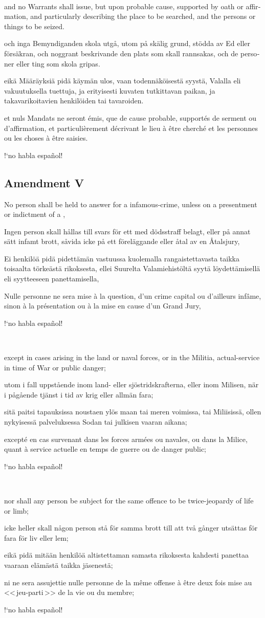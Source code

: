 \documentclass[a4paper,landscape,10pt]{article}
\newcommand{\tblock}[5]{\noindent\begin{minipage}[t]{0.18\textwidth}\foreignlanguage{english}{#1}\end{minipage}\hskip 0.025\textwidth\begin{minipage}[t]{0.18\textwidth}\foreignlanguage{swedish}{#2}\end{minipage}\hskip 0.025\textwidth\begin{minipage}[t]{0.18\textwidth}\foreignlanguage{finnish}{#3}\end{minipage}\hskip 0.025\textwidth\begin{minipage}[t]{0.18\textwidth}\foreignlanguage{french}{#4}\end{minipage}\hskip 0.025\textwidth\begin{minipage}[t]{0.18\textwidth}\foreignlanguage{spanish}{#5}\end{minipage}}
\begin{document}
~

\tblock
{and no Warrants shall issue, but upon probable cause, supported by \Gls{oath} or \gls{affirmation}, and particularly describing the place to be searched, and the persons or things to be seized.}
{och inga Bemyndiganden skola utgå, utom på skälig grund, stödda av Ed eller försäkran, och noggrant beskrivande den plats som skall rannsakas, och de personer eller ting som skola gripas.}
{eikä Määräyksiä pidä käymän ulos, vaan todennäköisestä syystä, Valalla eli vakuutuksella tuettuja, ja erityisesti kuvaten tutkittavan paikan, ja takavarikoitavien henkilöiden tai tavaroiden.}
{et nuls Mandats ne seront émis, que de cause probable, supportés de serment ou d'affirmation, et particulièrement décrivant le lieu à être cherché et les personnes ou les choses à être saisies.}
{!`no habla español!}

\subsection*{Amendment V}
\tblock
{No person shall be held to answer for a \gls{infamous-crime}, unless on a \gls{presentment} or \gls{indictment} of a \glslink{grand-jury}{Grand Jury},}
{Ingen person skall hållas till svars för ett med dödsstraff belagt, eller på annat sätt infamt brott, såvida icke på ett föreläggande eller åtal av en Åtalsjury,}
{Ei henkilöä pidä pidettämän vastuussa kuolemalla rangaistettavasta taikka toisaalta törkeästä rikoksesta, ellei Suurelta Valamiehistöltä syytä löydettämisellä eli syytteeseen panettamisella,}
{Nulle personne ne sera mise à la question, d'un crime capital ou d'ailleurs infâme, sinon à la présentation ou à la mise en cause d'un Grand Jury,}
{!`no habla español!}

~

\tblock
{except in cases arising in the land or naval forces, or in the Militia, \gls{actual-service} in time of War or public danger;}
{utom i fall uppstående inom land- eller sjöstridskrafterna, eller inom Milisen, när i pågående tjänst i tid av krig eller allmän fara;}
{sitä paitsi tapauksissa noustaen ylös maan tai meren voimissa, tai Miliisissä, ollen nykyisessä palveluksessa Sodan tai julkisen vaaran aikana;}
{excepté en cas survenant dans les forces armées ou navales, ou dans la Milice, quant à service actuelle en temps de guerre ou de danger public;}
{!`no habla español!}

~

\tblock
{nor shall any person be subject for the same offence to be \gls{twice-jeopardy} of life or limb;}
{icke heller skall någon person stå för samma brott till att två gånger utsättas för fara för liv eller lem;}
{eikä pidä mitään henkilöä altistettaman samasta rikoksesta kahdesti panettaa vaaraan elämästä taikka jäsenestä;}
{ni ne sera assujettie nulle personne de la même offense à être deux fois mise au <<\,jeu-parti\,>> de la vie ou du membre;}
{!`no habla español!}
\end{document}
